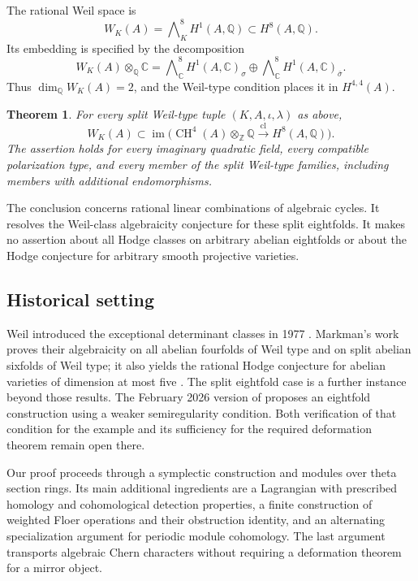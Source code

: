 \documentclass[11pt]{article}
\newtheorem{theorem}{Theorem}[section]
\theoremstyle{definition}
\theoremstyle{remark}
\numberwithin{equation}{section}
\begin{document}
The rational Weil space is
\[
 W_K(A)=\bigwedge\nolimits_K^8 H^1(A,\mathbb Q)\subset H^8(A,\mathbb Q).
\]
Its embedding is specified by the decomposition
\[
 W_K(A)\otimes_\mathbb Q\mathbb C=
 \bigwedge\nolimits_\mathbb C^8H^1(A,\mathbb C)_\sigma
 \oplus
 \bigwedge\nolimits_\mathbb C^8H^1(A,\mathbb C)_{\bar\sigma}.
\]
Thus $\dim_\mathbb Q W_K(A)=2$, and the Weil-type condition places it in
$H^{4,4}(A)$.

\begin{theorem}
\label{intro:main}
For every split Weil-type tuple $(K,A,\iota,\lambda)$ as above,
\[
 W_K(A)\subset
 \operatorname{im}\bigl(\operatorname{CH}^4(A)\otimes_\mathbb Z\mathbb Q
                \xrightarrow{\ \mathrm{cl}\ }H^8(A,\mathbb Q)\bigr).
\]
The assertion holds for every imaginary quadratic field, every compatible
polarization type, and every member of the split Weil-type families,
including members with additional endomorphisms.
\end{theorem}

The conclusion concerns rational linear combinations of algebraic cycles.
It resolves the Weil-class algebraicity conjecture for these split
eightfolds.  It makes no assertion about all Hodge classes on arbitrary
abelian eightfolds or about the Hodge conjecture for arbitrary smooth
projective varieties.

\subsection{Historical setting}

Weil introduced the exceptional determinant classes in 1977
\cite{weil}.  Markman's work proves their algebraicity on all abelian
fourfolds of Weil type and on split abelian sixfolds of Weil type;
it also yields the rational Hodge conjecture for abelian varieties of
dimension at most five \cite{markman-sixfold,markman-survey}.
The split eightfold case is a further instance beyond those results.
The February 2026 version of
\cite[Question~11.4 and Section~12]{markman-survey} proposes an eightfold
construction using a weaker semiregularity condition.  Both verification
of that condition for the example and its sufficiency for the required
deformation theorem remain open there.

Our proof proceeds through a symplectic construction and modules over
theta section rings.  Its main additional ingredients are a Lagrangian
with prescribed homology and cohomological detection properties, a finite
construction of weighted Floer operations and their obstruction identity,
and an alternating specialization argument for periodic module
cohomology.  The last argument transports algebraic Chern characters
without requiring a deformation theorem for a mirror object.
\end{document}
